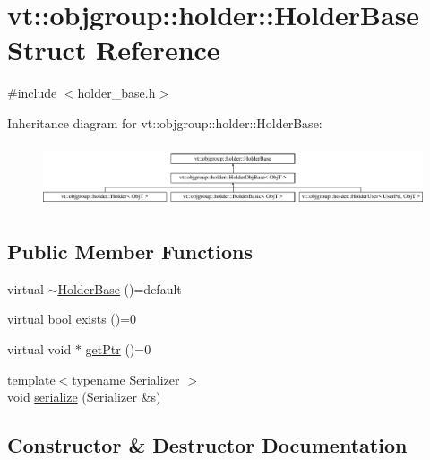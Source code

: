\hypertarget{structvt_1_1objgroup_1_1holder_1_1_holder_base}{}\section{vt\+:\+:objgroup\+:\+:holder\+:\+:Holder\+Base Struct Reference}
\label{structvt_1_1objgroup_1_1holder_1_1_holder_base}


{\ttfamily \#include $<$holder\+\_\+base.\+h$>$}

Inheritance diagram for vt\+:\+:objgroup\+:\+:holder\+:\+:Holder\+Base\+:\begin{figure}[H]
\begin{center}
\leavevmode
\includegraphics[height=1.866667cm]{structvt_1_1objgroup_1_1holder_1_1_holder_base}
\end{center}
\end{figure}
\subsection*{Public Member Functions}
\begin{DoxyCompactItemize}
\item 
virtual \hyperlink{structvt_1_1objgroup_1_1holder_1_1_holder_base_a9388d2780a5ffa01677c3c535d42fbfa}{$\sim$\+Holder\+Base} ()=default
\item 
virtual bool \hyperlink{structvt_1_1objgroup_1_1holder_1_1_holder_base_afeebbe358baf0b2bfea57f52807be564}{exists} ()=0
\item 
virtual void $\ast$ \hyperlink{structvt_1_1objgroup_1_1holder_1_1_holder_base_a0b40d32b476b94586468abb5ae9a53a6}{get\+Ptr} ()=0
\item 
{\footnotesize template$<$typename Serializer $>$ }\\void \hyperlink{structvt_1_1objgroup_1_1holder_1_1_holder_base_a0d01f16a16316fab236b8753e7530efb}{serialize} (Serializer \&s)
\end{DoxyCompactItemize}


\subsection{Constructor \& Destructor Documentation}
\mbox{\label{structvt_1_1objgroup_1_1holder_1_1_holder_base_a9388d2780a5ffa01677c3c535d42fbfa}} 
